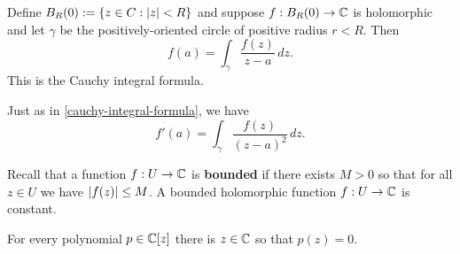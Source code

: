 \documentclass{homework}
\begin{document}
\begin{problem}\label{cauchy-integral-formula}Define $B_R(0) := \{ z \in C : \left|z\right| < R \}$ and suppose
  $f : B_R(0) \to \mathbb{C}$ is holomorphic and let $\gamma$ be the
  positively-oriented circle of positive radius $r < R$.  Then
  \[
    f(a) = \int_\gamma \frac{f(z)}{z-a} \, dz.
  \]
  This is the Cauchy integral formula.
\end{problem}

\begin{problem}
  Just as in \ref{cauchy-integral-formula}, we have
  \[
    f'(a) = \int_\gamma \frac{f(z)}{(z-a)^2} \, dz.
  \]
\end{problem}

\begin{problem}\label{liouville-theorem}Recall that a function $f : U \to \mathbb{C}$ is
  \textbf{bounded} if there exists $M > 0$ so that for all $z \in U$
  we have $\left|f(z)\right| \leq M$.  A bounded holomorphic function
  $f : U \to \mathbb{C}$ is constant.
\end{problem}

\begin{problem}
  For every polynomial $p \in \mathbb{C}[z]$ there is $z \in \mathbb{C}$ so that $p(z) = 0$.
\end{problem}
\end{document}
